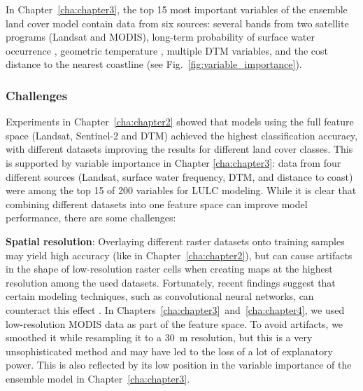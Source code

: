            In Chapter\@~\ref{cha:chapter3}, the top 15 most important variables of the ensemble land cover model contain data from six sources: several bands from two satellite programs (Landsat and MODIS), long-term probability of surface water occurrence \citep{pekel2016high}, geometric temperature \citep{kilibarda2014spatio}, multiple DTM variables, and the cost distance to the nearest coastline (see Fig.~\ref{fig:variable_importance}). 
    
        \subsubsection{Challenges}
            
            Experiments in Chapter\@~\ref{cha:chapter2} showed that models using the full feature space (Landsat, Sentinel-2 and DTM) achieved the highest classification accuracy, with different datasets improving the results for different land cover classes. This is supported by variable importance in Chapter \ref{cha:chapter3}: data from four different sources (Landsat, surface water frequency, DTM, and distance to coast) were among the top 15 of 200 variables for LULC modeling. While it is clear that combining different datasets into one feature space can improve model performance, there are some challenges:
    
            \textbf{Spatial resolution}: Overlaying different raster datasets onto training samples may yield high accuracy (like in Chapter\@~\ref{cha:chapter2}), but can cause artifacts in the shape of low-resolution raster cells when creating maps at the highest resolution among the used datasets. Fortunately, recent findings suggest that certain modeling techniques, such as convolutional neural networks, can counteract this effect \citep{robinson2019large}. In Chapters\@~\ref{cha:chapter3}\@~and\@~\ref{cha:chapter4}, we used low-resolution MODIS data as part of the feature space. To avoid artifacts, we smoothed it while resampling it to a 30~m resolution, but this is a very unsophisticated method and may have led to the loss of a lot of explanatory power. This is also reflected by its low position in the variable importance of the ensemble model in Chapter\@~\ref{cha:chapter3}.

